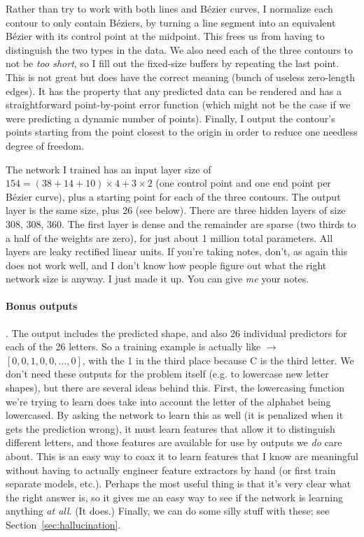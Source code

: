 \documentclass[twocolumn]{amsart}
\begin{document}

Rather than try to work with both lines and B\'ezier curves, I
normalize each contour to only contain B\'eziers, by turning a line
segment into an equivalent B\'ezier with its control point at the
midpoint. This frees us from having to distinguish the two types in
the data. We also need each of the three contours to not be {\em too
  short}, so I fill out the fixed-size buffers by repeating the last
point. This is not great but does have the correct meaning (bunch of
useless zero-length edges). It has the property that any predicted
data can be rendered and has a straightforward point-by-point error
function (which might not be the case if we were predicting a dynamic
number of points). Finally, I output the contour's points starting
from the point closest to the origin in order to reduce one needless
degree of freedom.

The network I trained has an input layer size of $154 = (38 + 14 + 10)
\times 4 + 3 \times 2$ (one control point and one end point per
B\'ezier curve), plus a starting point for each of the three contours.
The output layer is the same size, plus 26 (see below). There are
three hidden layers of size 308, 308, 360. The first layer is dense
and the remainder are sparse (two thirds to a half of the weights are
zero), for just about 1 million total parameters. All layers are leaky
rectified linear units. If you're taking notes, don't, as again this
does not work well, and I don't know how people figure out what the
right network size is anyway. I just made it up. You can give {\em me}
your notes.

\paragraph{Bonus outputs}. The output includes the predicted shape,
and also 26 individual predictors for each of the 26 letters. So a
training example is actually like  $\rightarrow$
 $[0, 0, 1, 0, 0, \ldots, 0]$, with the 1 in the third
place because C is the third letter. We don't need these outputs for
the problem itself (e.g. to lowercase new letter shapes), but there
are several ideas behind this. First, the lowercasing function we're
trying to learn does take into account the letter of the alphabet
being lowercased. By asking the network to learn this as well (it is
penalized when it gets the prediction wrong), it must learn features
that allow it to distinguish different letters, and those features are
available for use by outputs we {\em do} care about. This is an easy
way to coax it to learn features that I know are meaningful without
having to actually engineer feature extractors by hand (or first train
separate models, etc.). Perhaps the most useful thing is that it's
very clear what the right answer is, so it gives me an easy way to see
if the network is learning anything {\em at all}. (It does.) Finally,
we can do some silly stuff with these; see
Section~\ref{sec:hallucination}.
\end{document}
